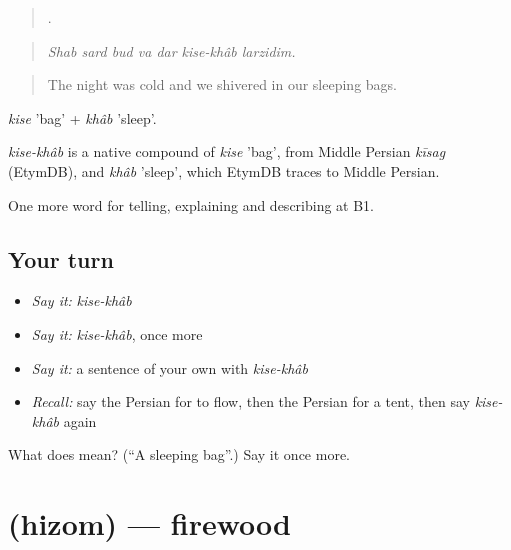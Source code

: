 \begin{quote}
       .
\end{quote}

\begin{quote}
\emph{Shab sard bud va dar kise-khâb larzidim.}
\end{quote}

\begin{quote}
The night was cold and we shivered in our sleeping bags.
\end{quote}

\emph{kise} 'bag' + \emph{khâb} 'sleep'.

\begin{cousinweb}
\emph{kise-khâb} is a native compound of \emph{kise} 'bag', from Middle Persian \emph{kīsag} (EtymDB), and \emph{khâb} 'sleep', which EtymDB traces to Middle Persian.
\end{cousinweb}

\begin{grammarlens}[title={What you've built}]
One more word for telling, explaining and describing at B1.
\end{grammarlens}

\subsection*{Your turn}
\begin{itemize}
\raggedright
  \item \emph{Say it:} \emph{kise-khâb}
  \item \emph{Say it:} \emph{kise-khâb}, once more
  \item \emph{Say it:} a sentence of your own with \emph{kise-khâb}
  \item \emph{Recall:} say the Persian for to flow, then the Persian for a tent, then say \emph{kise-khâb} again
\end{itemize}

\begin{tcolorbox}[breakable,colback=teal!4,colframe=teal!35!black,title={Before you move on}]
What does   mean? (\textquotedblleft{}A sleeping bag\textquotedblright{}.) Say it once more.
\end{tcolorbox}
\section[\texorpdfstring{\fa{هیزم} (hizom)}{هیزم (hizom)}]{ (hizom) — firewood}

